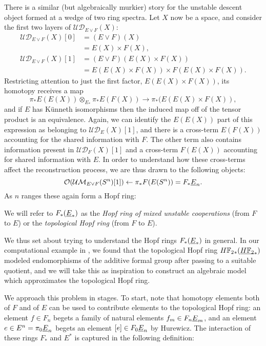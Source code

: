 There is a similar (but algebraically murkier) story for the unstable descent object formed at a wedge of two ring spectra.  Let \(X\) now be a space, and consider the first two layers of \(\mathcal{UD}_{E \vee F}(X)\):
\begin{align*}
\mathcal{UD}_{E \vee F}(X)[0] & = (E \vee F)(X) \\
& = E(X) \times F(X), \\
\mathcal{UD}_{E \vee F}(X)[1] & = (E \vee F)(E(X) \times F(X)) \\
& = E(E(X) \times F(X)) \times F(E(X) \times F(X)).
\end{align*}
Restricting attention to just the first factor, \(E(E(X) \times F(X))\), its homotopy receives a map \[\pi_* E(E(X)) \otimes_{E_*} \pi_* E(F(X)) \to \pi_*(E(E(X) \times F(X)),\] and if \(E\) has K\"unneth isomorphisms then the induced map off of the tensor product is an equivalence.  Again, we can identify the \(E(E(X))\) part of this expression as belonging to \(\mathcal{UD}_E(X)[1]\), and there is a cross-term \(E(F(X))\) accounting for the shared information with \(F\).  The other term also contains information present in \(\mathcal{UD}_F(X)[1]\) and a cross-term \(F(E(X))\) accounting for shared information with \(E\).  In order to understand how these cross-terms affect the reconstruction process, we are thus drawn to the following objects: \[\mathcal{O}(\mathcal{UM}_{E \vee F}(S^n)[1]) \leftarrow \pi_* F(E(S^n)) = F_* \underline{\smash{E}}_{n}.\]  As \(n\) ranges these again form a Hopf ring:

\begin{definition}
We will refer to \(F_*(\underline{\smash{E}}_{*})\) as the \textit{Hopf ring of mixed unstable cooperations} (from \(F\) to \(E\)) or the \textit{topological Hopf ring} (from \(F\) to \(E\)).
\end{definition}

We thus set about trying to understand the Hopf rings \(F_*(\underline{\smash{E}}_{*})\) in general.  In our computational example in , we found that the topological Hopf ring \(\HFtwo_*(\OS{\HFtwo}{*})\) modeled endomorphisms of the additive formal group after passing to a suitable quotient, and we will take this as inspiration to construct an algebraic model which approximates the topological Hopf ring.

We approach this problem in stages.  To start, note that homotopy elements both of \(F\) and of \(E\) can be used to contribute elements to the topological Hopf ring: an element \(f \in F_n\) begets a family of natural elements \(f_m \in F_n \underline{\smash{E}}_{m}\), and an element \(e \in E^n = \pi_0 \underline{\smash{E}}_{n}\) begets an element \([e] \in F_0 \underline{\smash{E}}_{n}\) by Hurewicz.  The interaction of these rings \(F_*\) and \(E^*\) is captured in the following definition:

